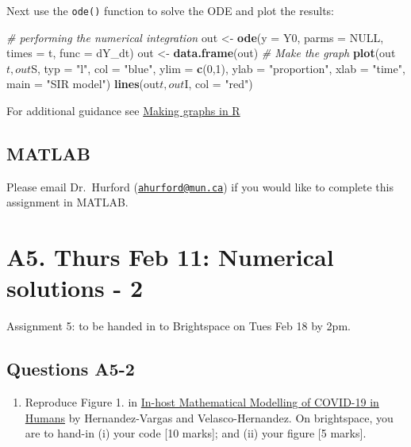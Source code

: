 \documentclass[]{book}
\newenvironment{Shaded}{\begin{snugshade}}{\end{snugshade}}
\newcommand{\KeywordTok}[1]{\textcolor[rgb]{0.13,0.29,0.53}{\textbf{{#1}}}}
\newcommand{\DataTypeTok}[1]{\textcolor[rgb]{0.13,0.29,0.53}{{#1}}}
\newcommand{\DecValTok}[1]{\textcolor[rgb]{0.00,0.00,0.81}{{#1}}}
\newcommand{\StringTok}[1]{\textcolor[rgb]{0.31,0.60,0.02}{{#1}}}
\newcommand{\CommentTok}[1]{\textcolor[rgb]{0.56,0.35,0.01}{\textit{{#1}}}}
\newcommand{\OtherTok}[1]{\textcolor[rgb]{0.56,0.35,0.01}{{#1}}}
\newcommand{\NormalTok}[1]{{#1}}
\providecommand{\tightlist}{%
  \setlength{\itemsep}{0pt}\setlength{\parskip}{0pt}}
\begin{document}
Next use the \texttt{ode()} function to solve the ODE and plot the
results:

\begin{Shaded}
\begin{Highlighting}[]
\CommentTok{# performing the numerical integration}
\NormalTok{out <-}\StringTok{ }\KeywordTok{ode}\NormalTok{(}\DataTypeTok{y =} \NormalTok{Y0, }\DataTypeTok{parms =} \OtherTok{NULL}\NormalTok{, }\DataTypeTok{times =} \NormalTok{t, }\DataTypeTok{func =} \NormalTok{dY_dt)}
\NormalTok{out <-}\StringTok{ }\KeywordTok{data.frame}\NormalTok{(out)}
\CommentTok{# Make the graph}
\KeywordTok{plot}\NormalTok{(out$t, out$S, }\DataTypeTok{typ =} \StringTok{"l"}\NormalTok{, }\DataTypeTok{col =} \StringTok{"blue"}\NormalTok{, }\DataTypeTok{ylim =} \KeywordTok{c}\NormalTok{(}\DecValTok{0}\NormalTok{,}\DecValTok{1}\NormalTok{), }\DataTypeTok{ylab =} \StringTok{"proportion"}\NormalTok{, }\DataTypeTok{xlab =} \StringTok{"time"}\NormalTok{, }\DataTypeTok{main =} \StringTok{"SIR model"}\NormalTok{)}
\KeywordTok{lines}\NormalTok{(out$t, out$I, }\DataTypeTok{col =} \StringTok{"red"}\NormalTok{)}
\end{Highlighting}
\end{Shaded}

For additional guidance see
\href{https://ahurford.github.io/quant-guide-all-courses/graph.html}{Making
graphs in R}

\section{MATLAB}\label{matlab}

Please email Dr.~Hurford
(\href{mailto:ahurford@mun.ca}{\nolinkurl{ahurford@mun.ca}}) if you
would like to complete this assignment in MATLAB.

\chapter{A5. Thurs Feb 11: Numerical solutions -
2}\label{a5.-thurs-feb-11-numerical-solutions---2}

Assignment 5: to be handed in to Brightspace on Tues Feb 18 by 2pm.

\section{Questions A5-2}\label{questions-a5-2}

\begin{enumerate}
\def\labelenumi{\arabic{enumi}.}
\setcounter{enumi}{1}
\tightlist
\item
  Reproduce Figure 1. in
  \href{https://www-ncbi-nlm-nih-gov.qe2a-proxy.mun.ca/pmc/articles/PMC7526677/}{In-host
  Mathematical Modelling of COVID-19 in Humans} by Hernandez-Vargas and
  Velasco-Hernandez. On brightspace, you are to hand-in (i) your code
  {[}10 marks{]}; and (ii) your figure {[}5 marks{]}.
\end{enumerate}
\end{document}
